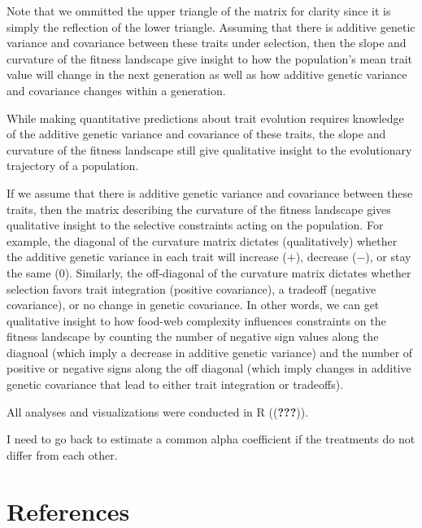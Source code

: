 \documentclass[]{elsarticle} %
\begin{document}
Note that we ommitted the upper triangle of the matrix for clarity since
it is simply the reflection of the lower triangle. Assuming that there
is additive genetic variance and covariance between these traits under
selection, then the slope and curvature of the fitness landscape give
insight to how the population's mean trait value will change in the next
generation as well as how additive genetic variance and covariance
changes within a generation.

While making quantitative predictions about trait evolution requires
knowledge of the additive genetic variance and covariance of these
traits, the slope and curvature of the fitness landscape still give
qualitative insight to the evolutionary trajectory of a population.

If we assume that there is additive genetic variance and covariance
between these traits, then the matrix describing the curvature of the
fitness landscape gives qualitative insight to the selective constraints
acting on the population. For example, the diagonal of the curvature
matrix dictates (qualitatively) whether the additive genetic variance in
each trait will increase (\(+\)), decrease (\(-\)), or stay the same
(\(0\)). Similarly, the off-diagonal of the curvature matrix dictates
whether selection favors trait integration (positive covariance), a
tradeoff (negative covariance), or no change in genetic covariance. In
other words, we can get qualitative insight to how food-web complexity
influences constraints on the fitness landscape by counting the number
of negative sign values along the diagnoal (which imply a decrease in
additive genetic variance) and the number of positive or negative signs
along the off diagonal (which imply changes in additive genetic
covariance that lead to either trait integration or tradeoffs).

All analyses and visualizations were conducted in R (({\textbf{???}})).

I need to go back to estimate a common alpha coefficient if the
treatments do not differ from each other.

\section*{References}\label{references}
\end{document}
